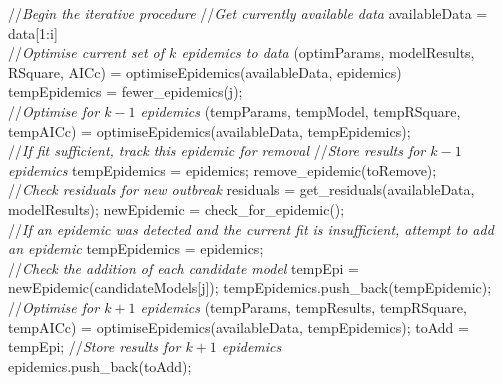 \begin{algorithm}
  \begin{algorithmic}
    \State //\emph{Begin the iterative procedure}
    \State //\emph{Get currently available data}
    \State availableData = data[1:i]\\
    \State //\emph{Optimise current set of $k$ epidemics to data}
    \State (optimParams, modelResults, RSquare, AICc) =
      optimiseEpidemics(availableData, epidemics)
      \\
        \State tempEpidemics = fewer\_epidemics(j);\\
        \State //\emph{Optimise for $k-1$ epidemics}
        \State (tempParams, tempModel, tempRSquare, tempAICc) =
        optimiseEpidemics(availableData, tempEpidemics);\\
        \State //\emph{If fit sufficient, track this epidemic for removal}
        \State //\emph{Store results for $k-1$ epidemics}
        \EndIf
        \State tempEpidemics = epidemics;
        \EndFor
        \EndIf
      \State remove\_epidemic(toRemove);
      \\
      \State //\emph{Check residuals for new outbreak}
      \State residuals = get\_residuals(availableData, modelResults);
      \State newEpidemic = check\_for\_epidemic();
   \\ 
   \State //\emph{If an epidemic was detected and the current fit is
     insufficient, attempt to add an epidemic}
   \State tempEpidemics = epidemics;
   \\
   \State //\emph{Check the addition of each candidate model}
   \State tempEpi = newEpidemic(candidateModels[j]);
   \State tempEpidemics.push\_back(tempEpidemic);\\
   \State //\emph{Optimise for $k+1$ epidemics}
   \State (tempParams, tempResults, tempRSquare, tempAICc) = optimiseEpidemics(availableData, tempEpidemics);
   \State toAdd = tempEpi;
   \State //\emph{Store results for $k+1$ epidemics}
   \EndIf
   \EndFor
   \EndIf\\
    epidemics.push\_back(toAdd); \EndIf
   \EndFor
   \EndFunction
  \end{algorithmic}
  \label{fig:realtime}
  \end{algorithm}

